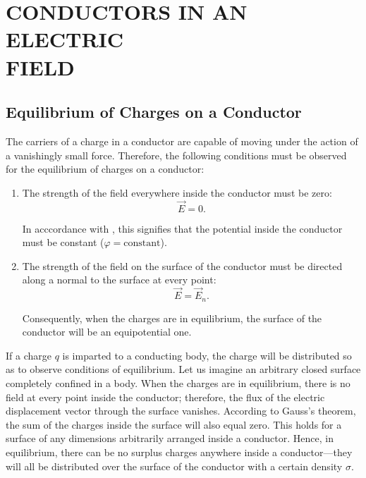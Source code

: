 

\chapter[CONDUCTORS IN AN ELECTRIC FIELD]{CONDUCTORS IN AN ELECTRIC \\FIELD}\label{chap:3}


\section{Equilibrium of Charges on a Conductor}\label{sec:3_1}

The carriers of a charge in a conductor are capable of moving under the action of a vanishingly small force. Therefore, the following conditions must be observed for the equilibrium of charges on a conductor:
\begin{enumerate}[1.]
    \item The strength of the field everywhere inside the conductor must be zero:
    \begin{equation}\label{eq:3_1}
        \vec{E} = 0.
    \end{equation}

    \noindent
    In acccordance with , this signifies that the potential inside the conductor must be constant ($\varphi=\text{constant}$).

    \item The strength of the field on the surface of the conductor must be directed along a normal to the surface at every point:
    \begin{equation}\label{eq:3_2}
        \vec{E} = \vec{E}_n.
    \end{equation}

    \noindent
    Consequently, when the charges are in equilibrium, the surface of the conductor will be an equipotential one.
\end{enumerate}

If a charge $q$ is imparted to a conducting body, the charge will be distributed so as to observe conditions of equilibrium. Let us imagine an arbitrary closed surface completely confined in a body. When the charges are in equilibrium, there is no field at every point inside the conductor; therefore, the flux of the electric displacement vector through the surface vanishes. According to Gauss's theorem, the sum of the charges inside the surface will also equal zero. This holds for a surface of any dimensions arbitrarily arranged inside a conductor. Hence, in equilibrium, there can be no surplus charges anywhere inside a conductor---they will all be distributed over the surface of the conductor with a certain density $\sigma$.

